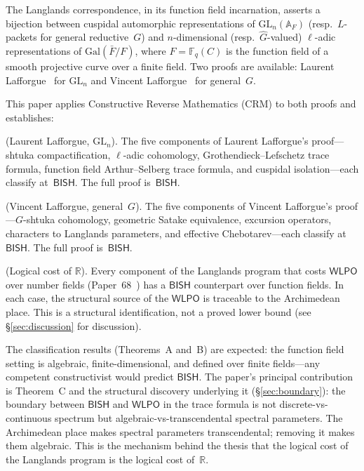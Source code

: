 \documentclass[11pt]{article}
\theoremstyle{plain}
\theoremstyle{definition}
\theoremstyle{remark}
\newcommand{\R}{\mathbb{R}}
\newcommand{\Fq}{\mathbb{F}_q}
\newcommand{\A}{\mathbb{A}}
\newcommand{\Gal}{\mathrm{Gal}}
\newcommand{\GL}{\mathrm{GL}}
\newcommand{\CRM}{\mathrm{CRM}}
\newcommand{\dualG}{\widehat{G}}
\newcommand{\BISH}{\mathsf{BISH}}
\newcommand{\WLPO}{\mathsf{WLPO}}
\begin{document}
The Langlands correspondence, in its function field incarnation, asserts a
bijection between cuspidal automorphic representations of $\GL_n(\A_F)$ (resp.\
$L$-packets for general reductive~$G$) and $n$-dimensional (resp.\
$\dualG$-valued) $\ell$-adic representations of $\Gal(\bar{F}/F)$, where
$F = \Fq(C)$ is the function field of a smooth projective curve over a finite
field. Two proofs are available: Laurent Lafforgue~\cite{LLaf02} for $\GL_n$
and Vincent Lafforgue~\cite{VLaf18} for general~$G$.

This paper applies Constructive Reverse Mathematics ($\CRM$) to both proofs
and establishes:

\begin{description}[leftmargin=2em]
\item[Theorem A] (Laurent Lafforgue, $\GL_n$). The five components of
  Laurent Lafforgue's proof---shtuka compactification, $\ell$-adic cohomology,
  Grothendieck--Lefschetz trace formula, function field Arthur--Selberg trace
  formula, and cuspidal isolation---each classify at~$\BISH$. The full proof
  is~$\BISH$.

\item[Theorem B] (Vincent Lafforgue, general~$G$). The five components of
  Vincent Lafforgue's proof---$G$-shtuka cohomology, geometric Satake
  equivalence, excursion operators, characters to Langlands parameters, and
  effective Chebotarev---each classify at~$\BISH$. The full proof is~$\BISH$.

\item[Theorem C] (Logical cost of $\R$). Every component of the Langlands
  program that costs $\WLPO$ over number fields (Paper~68~\cite{Paper68}) has a
  $\BISH$ counterpart over function fields. In each case, the structural source
  of the $\WLPO$ is traceable to the Archimedean place. This is a structural
  identification, not a proved lower bound (see \S\ref{sec:discussion} for
  discussion).
\end{description}

\noindent
The classification results (Theorems~A and~B) are expected: the function field
setting is algebraic, finite-dimensional, and defined over finite fields---any
competent constructivist would predict $\BISH$. The paper's principal
contribution is Theorem~C and the structural discovery underlying it
(\S\ref{sec:boundary}): the boundary between $\BISH$ and $\WLPO$ in the trace
formula is not discrete-vs-continuous spectrum but
algebraic-vs-transcendental spectral parameters. The Archimedean place makes
spectral parameters transcendental; removing it makes them algebraic. This is
the mechanism behind the thesis that the logical cost of the Langlands program
is the logical cost of~$\R$.
\end{document}
